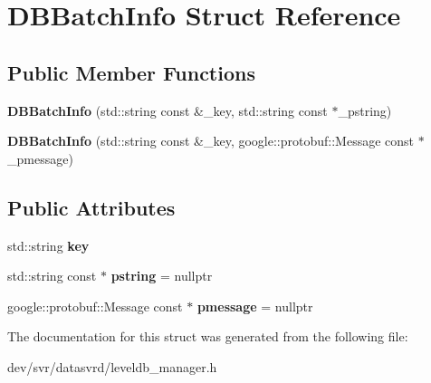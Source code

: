\hypertarget{structDBBatchInfo}{
\section{DBBatchInfo Struct Reference}
\label{structDBBatchInfo}
}
\subsection*{Public Member Functions}
\begin{DoxyCompactItemize}
\item 
\hypertarget{structDBBatchInfo_a756c51958eb73cb801c32fc1a8cdeb15}{
{\bfseries DBBatchInfo} (std::string const \&\_\-key, std::string const $\ast$\_\-pstring)}
\label{structDBBatchInfo_a756c51958eb73cb801c32fc1a8cdeb15}

\item 
\hypertarget{structDBBatchInfo_a39d484fe314629218cd3f94b94d414e0}{
{\bfseries DBBatchInfo} (std::string const \&\_\-key, google::protobuf::Message const $\ast$\_\-pmessage)}
\label{structDBBatchInfo_a39d484fe314629218cd3f94b94d414e0}

\end{DoxyCompactItemize}
\subsection*{Public Attributes}
\begin{DoxyCompactItemize}
\item 
\hypertarget{structDBBatchInfo_a5c3c6d4d1fe8bad6f418c2d827de5dc1}{
std::string {\bfseries key}}
\label{structDBBatchInfo_a5c3c6d4d1fe8bad6f418c2d827de5dc1}

\item 
\hypertarget{structDBBatchInfo_a979ac7972288a65f2e417ca1ba9444d8}{
std::string const $\ast$ {\bfseries pstring} = nullptr}
\label{structDBBatchInfo_a979ac7972288a65f2e417ca1ba9444d8}

\item 
\hypertarget{structDBBatchInfo_a2aab0de3d19fdfa1b0c0d78a40763759}{
google::protobuf::Message const $\ast$ {\bfseries pmessage} = nullptr}
\label{structDBBatchInfo_a2aab0de3d19fdfa1b0c0d78a40763759}

\end{DoxyCompactItemize}


The documentation for this struct was generated from the following file:\begin{DoxyCompactItemize}
\item 
dev/svr/datasvrd/leveldb\_\-manager.h\end{DoxyCompactItemize}
